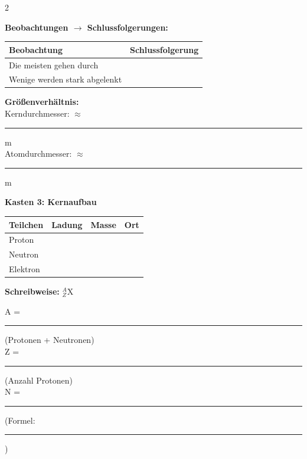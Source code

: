 \documentclass[10pt, a4paper]{article}
\newcommand{\fachfarbe}{physik}
\newcommand{\luecke}[1]{\rule{#1}{0.4pt}}
\newcommand{\abschnitt}[1]{%
    \vspace{8pt}
    \noindent\textbf{\textcolor{\fachfarbe}{#1}}
    \vspace{4pt}
}
\begin{document}
\begin{multicols}{2}
\begin{merksatz}
\vspace{6pt}

\textbf{Beobachtungen $\rightarrow$ Schlussfolgerungen:}

\vspace{4pt}

\renewcommand{\arraystretch}{1.6}
\begin{tabular}{|p{2.8cm}|p{3.2cm}|}
\hline
\textbf{Beobachtung} & \textbf{Schlussfolgerung} \\
\hline
Die meisten gehen durch & \\
\hline
Wenige werden stark abgelenkt & \\
\hline
\end{tabular}
\renewcommand{\arraystretch}{1}

\vspace{6pt}

\textbf{Größenverhältnis:}\\
Kerndurchmesser: $\approx$ \luecke{1.5cm} m\\
Atomdurchmesser: $\approx$ \luecke{1.5cm} m
\end{merksatz}

\vspace{6pt}


\abschnitt{Kasten 3: Kernaufbau}

\begin{merksatz}
\renewcommand{\arraystretch}{1.5}
\begin{tabular}{|l|c|c|c|}
\hline
\textbf{Teilchen} & \textbf{Ladung} & \textbf{Masse} & \textbf{Ort} \\
\hline
Proton & & & \\
\hline
Neutron & & & \\
\hline
Elektron & & & \\
\hline
\end{tabular}
\renewcommand{\arraystretch}{1}

\vspace{8pt}

\textbf{Schreibweise:} $^{A}_{Z}$X

\vspace{4pt}

A = \luecke{3cm} (Protonen + Neutronen)\\
Z = \luecke{3cm} (Anzahl Protonen)\\
N = \luecke{3cm} (Formel: \luecke{1.5cm})
\end{merksatz}


\end{multicols}
\end{document}

